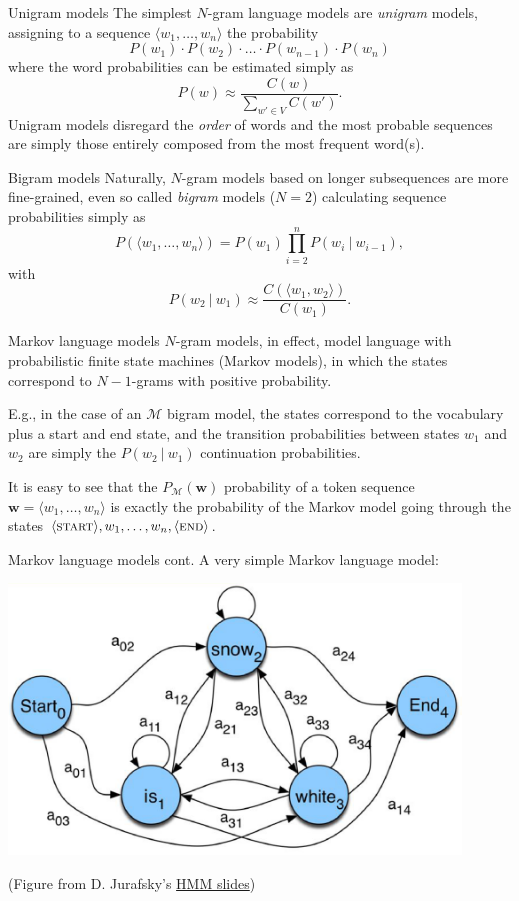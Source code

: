 \documentclass[style=upen, size=14pt]{powerdot}
\newcommand{\gold}{\color{arany}}
\theoremstyle{definition}
\begin{document}
\begin{slide}[toc=Unigram models]{Unigram models}
  The simplest $N$-gram language models are \emph{\gold unigram} models,
  assigning to a sequence $\langle w_1,\dots,w_n \rangle$ the probability
  $$
  P(w_1)\cdot P(w_2)\cdot \dots \cdot P(w_{n-1})\cdot P(w_n)
  $$
  where the word probabilities can be estimated simply as
  $$
  P(w) \approx \frac{C(w)}{\sum_{w' \in V}C(w')}.
  $$
  Unigram models disregard the \emph{order} of words and the most probable
  sequences are simply those entirely composed from the most frequent word(s).
\end{slide}

\begin{slide}[toc=Bigram models]{Bigram models}
  Naturally, $N$-gram models based on longer subsequences are more fine-grained,
  even so called \emph{bigram} models ($N=2$) calculating sequence probabilities
  simply as
  $$
  P(\langle w_1,\dots,w_n \rangle) = P(w_1)\prod_{i=2}^n P(w_i ~\vert~ w_{i-1}),
  $$
  with
  $$
  P(w_2~\vert~ w_1) \approx \frac{C(\langle w_1,w_2\rangle)}{C(w_1)}.
  $$
\end{slide}

\begin{slide}[toc=Markov models]{Markov language models}
  $N$-gram models, in effect, model language with probabilistic finite state
  machines (Markov models), in which the states correspond to $N-1$-grams with
  positive probability.\bigskip

  E.g., in the case of an $\mathcal M$ bigram model, the states correspond to
  the vocabulary plus a start and end state, and the transition probabilities
  between states $w_1$ and $w_2$ are simply the $P(w_2 ~\vert~ w_1)$
  continuation probabilities.\bigskip

  It is easy to see that the $P_\mathcal{M}(\mathbf{w})$ probability of a token
  sequence $\mathbf{w}=\langle w_1,\dots,w_n \rangle$ is exactly the
  probability of the Markov model going through the states
  $\langle \textsc{start}\rangle,w_1,\dots,w_n,\langle\textsc{end}\rangle$.
\end{slide}

\begin{slide}[toc=]{Markov language models cont.}
  A very simple Markov language model:
  \begin{center}
    \includegraphics[width=0.9\textwidth]{figures/markov_lm.eps}
  \end{center}
  \small(Figure from D. Jurafsky's \href{https://slideplayer.com/slide/4578484/}{HMM slides})
\end{slide}
\end{document}

